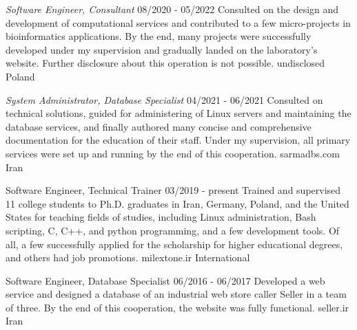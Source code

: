 \documentclass[a4paper,12pt]{memoir} %
\begin{document}
{\textit{Software Engineer, Consultant}}
{08/2020 - 05/2022}
{Consulted on the design and development of computational services and contributed to a few micro-projects in bioinformatics applications. By the end, many projects were successfully developed under my supervision and gradually landed on the laboratory’s website. Further disclosure about this operation is not possible.}
{undisclosed}
{Poland}


{\textit{System Administrator, Database Specialist}}
{04/2021 - 06/2021}
{Consulted on technical solutions, guided for administering of Linux servers and maintaining the database services, and finally authored many concise and comprehensive documentation for the education of their staff.
Under my supervision, all primary services were set up and running by the end of this cooperation.}
{sarmadbs.com}
{Iran}


{Software Engineer, Technical Trainer}
{03/2019 - present}
{Trained and supervised 11 college students to Ph.D. graduates in Iran, Germany, Poland, and the United States for teaching fields of studies, including Linux administration, Bash scripting, C, C++, and python programming, and a few development tools.
Of all, a few successfully applied for the scholarship for higher educational degrees, and others had job promotions.}
{milextone.ir}
{International}


{Software Engineer, Database Specialist}
{06/2016 - 06/2017}
{Developed a web service and designed a database of an industrial web store caller Seller in a team of three.
By the end of this cooperation, the website was fully functional.}
{seller.ir}
{Iran}


\Sep %

\end{document}
